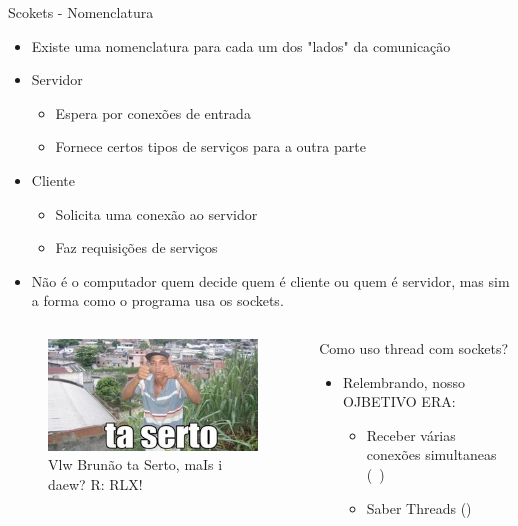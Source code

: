 \documentclass[10pt, xcolor=x11names]{beamer}
\begin{document}
\begin{frame}
	\begin{block}{Scokets - Nomenclatura}
		\begin{itemize}
			\item<1-> Existe uma nomenclatura para cada um dos "lados" da comunicação
			\item<2-> Servidor
				\begin{itemize}
					\item Espera por conexões de entrada
					\item Fornece certos tipos de serviços para a outra parte
				\end{itemize}
			\item<3-> Cliente
				\begin{itemize}
					\item Solicita uma conexão ao servidor
					\item Faz requisições de serviços
				\end{itemize}
			
			\item<4-> Não é o computador quem decide quem é cliente ou quem é servidor, mas sim a forma como o programa usa os sockets.
		\end{itemize}
	\end{block}
\end{frame}
\begin{frame}
	\begin{columns}
			\begin{figure}
				\includegraphics[width=.8\linewidth]{img/taserto.png}
				\caption{Vlw Brunão ta Serto, maIs i daew? R: RLX!}
			\end{figure}
		

		\begin{block}{Como uso thread com sockets?}
			\begin{itemize}
				\item Relembrando, nosso OJBETIVO ERA:
					\begin{itemize}
						\item Receber várias conexões simultaneas (~)
						\item Saber Threads (\checkmark)
					\end{itemize}
			\end{itemize}
		\end{block}
		
	\end{columns}
\end{frame}
\end{document}
